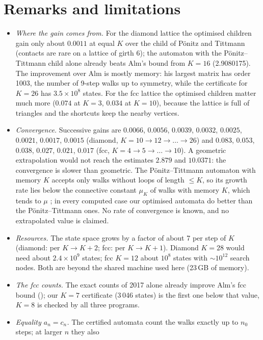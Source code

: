 \documentclass[11pt,a4paper]{report}
\begin{document}
\section{Remarks and limitations}\label{sec:remarks}

\begin{itemize}
\item \emph{Where the gain comes from.} For the diamond lattice the optimised children gain only about \(0.0011\) at
equal \(K\) over the child of Pönitz and Tittmann (contacts are rare on a lattice of girth 6); the automaton with the
Pönitz--Tittmann child alone already beats Alm's bound from \(K=16\) (2.9080175). The improvement over Alm is mostly
memory: his largest matrix has order 1003, the number of 9-step walks up to symmetry, while the certificate for
\(K=26\) has \(3.5\times10^8\) states. For the fcc lattice the optimised children matter much more (\(0.074\) at \(K=3\),
\(0.034\) at \(K=10\)), because the lattice is full of triangles and the shortcuts keep the nearby vertices.
\item \emph{Convergence.} Successive gains are \(0.0066\), \(0.0056\), \(0.0039\), \(0.0032\), \(0.0025\), \(0.0021\), \(0.0017\), \(0.0015\) (diamond,
\(K=10\to12\to\dots\to26\)) and \(0.083\), \(0.053\), \(0.038\), \(0.027\), \(0.021\), \(0.017\) (fcc, \(K=4\to5\to\dots\to10\)). A geometric
extrapolation would not reach the estimates \(2.879\) and \(10.0371\): the convergence is slower than geometric. The
Pönitz--Tittmann automaton with memory \(K\) accepts only walks without loops of length \(\le K\), so its growth rate lies
below the connective constant \(\mu_K\) of walks with memory \(K\), which tends to \(\mu\) \autocite[Lemma
1.2.3]{MadrasSlade1993}; in every computed case our optimised automata do better than the Pönitz--Tittmann ones. No
rate of convergence is known, and no extrapolated value is claimed.
\item \emph{Resources.} The state space grows by a factor of about 7 per step of \(K\) (diamond: per \(K\to K+2\); fcc: per
\(K\to K+1\)). Diamond \(K=28\) would need about \(2.4\times10^9\) states; fcc \(K=12\) about \(10^8\) states with
\(\sim10^{12}\) search nodes. Both are beyond the shared machine used here (23\,GB of memory).
\item \emph{The fcc counts.} The exact counts of 2017 alone already improve Alm's fcc bound (); our
\(K=7\) certificate (3\,046 states) is the first one below that value, \(K=8\) is checked by all three programs.
\item \emph{Equality \(a_n=c_n\).} The certified automata count the walks exactly up to \(n_0\) steps; at larger \(n\) they also

\end{itemize}
\end{document}
